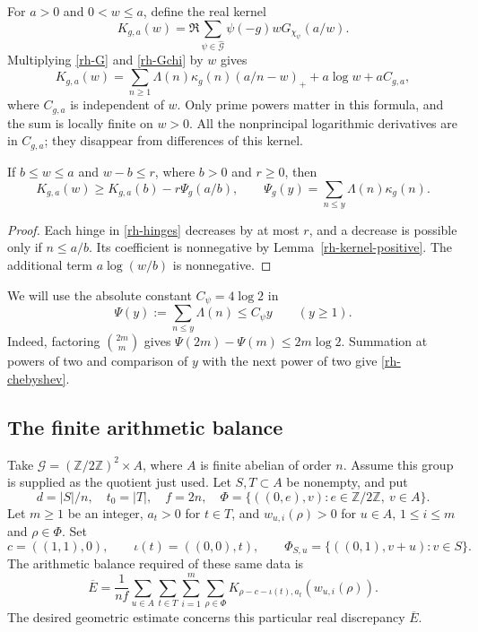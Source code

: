 For $a>0$ and $0<w\le a$, define the real kernel
\[
 K_{g,a}(w)=\Re\sum_{\psi\in\widehat{\mathcal G}}
                         \psi(-g)wG_{\chi_\psi}(a/w).
\]
Multiplying \eqref{rh-G} and \eqref{rh-Gchi} by $w$ gives
\begin{equation}\label{rh-hinges}
 K_{g,a}(w)=\sum_{n\ge1}\Lambda(n)\kappa_g(n)(a/n-w)_+
                            +a\log w+aC_{g,a},
\end{equation}
where $C_{g,a}$ is independent of $w$. Only prime powers matter in
this formula, and the sum is locally finite on $w>0$.
All the nonprincipal logarithmic derivatives are in $C_{g,a}$;
they disappear from differences of this kernel.

\begin{lemma}
\label{rh-freeze}
If $b\le w\le a$ and $w-b\le r$, where $b>0$ and $r\ge0$, then
\[
 K_{g,a}(w)\ge K_{g,a}(b)-r\Psi_g(a/b),\qquad
 \Psi_g(y)=\sum_{n\le y}\Lambda(n)\kappa_g(n).
\]
\end{lemma}

\begin{proof}
Each hinge in \eqref{rh-hinges} decreases by at most $r$, and a
decrease is possible only if $n\le a/b$. Its coefficient is
nonnegative by Lemma~\ref{rh-kernel-positive}. The additional
term $a\log(w/b)$ is nonnegative.
\end{proof}

We will use the absolute constant $C_\psi=4\log2$ in
\begin{equation}\label{rh-chebyshev}
 \Psi(y):=\sum_{n\le y}\Lambda(n)\le C_\psi y\qquad(y\ge1).
\end{equation}
Indeed, factoring $\binom{2m}{m}$ gives
$\Psi(2m)-\Psi(m)\le2m\log2$. Summation at powers of two and
comparison of $y$ with the next power of two give \eqref{rh-chebyshev}.

\subsection{The finite arithmetic balance}

Take $\mathcal G=(\mathbb Z/2\mathbb Z)^2\times A$, where $A$ is
finite abelian of order $n$. Assume this group is supplied as the
quotient just used. Let $S,T\subset A$ be nonempty, and put
\[
 d=|S|/n,\quad t_0=|T|,\quad f=2n,\quad
 \Phi=\{((0,e),v):e\in\mathbb Z/2\mathbb Z,\ v\in A\}.
\]
Let $m\ge1$ be an integer, $a_t>0$ for $t\in T$, and
$w_{u,i}(\rho)>0$ for $u\in A$, $1\le i\le m$ and $\rho\in\Phi$.
Set
\[
 c=((1,1),0),\qquad \iota(t)=((0,0),t),\qquad
 \Phi_{S,u}=\{((0,1),v+u):v\in S\}.
\]
The arithmetic balance required of these same data is
\begin{equation}\label{rh-balance}
 \overline E=\frac1{nf}\sum_{u\in A}\sum_{t\in T}\sum_{i=1}^m
   \sum_{\rho\in\Phi}K_{\rho-c-\iota(t),a_t}(w_{u,i}(\rho)).
\end{equation}
The desired geometric estimate concerns this particular real
discrepancy $\overline E$.

